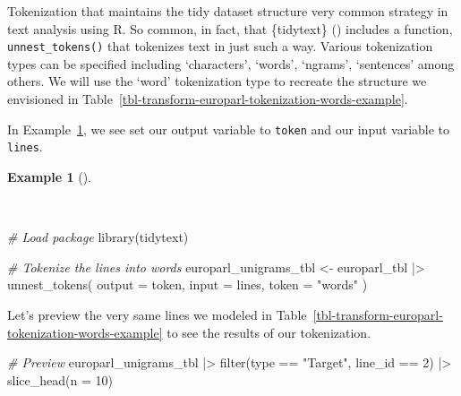 \documentclass[
  letterpaper,
]{latex/krantz}
\newenvironment{Shaded}{\begin{snugshade}}{\end{snugshade}}
\newcommand{\AttributeTok}[1]{\textcolor[rgb]{0.00,0.00,0.00}{#1}}
\newcommand{\CommentTok}[1]{\textcolor[rgb]{0.00,0.00,0.00}{\textit{#1}}}
\newcommand{\DecValTok}[1]{\textcolor[rgb]{0.00,0.00,0.00}{#1}}
\newcommand{\FunctionTok}[1]{\textcolor[rgb]{0.00,0.00,0.00}{#1}}
\newcommand{\NormalTok}[1]{\textcolor[rgb]{0.00,0.00,0.00}{#1}}
\newcommand{\OtherTok}[1]{\textcolor[rgb]{0.00,0.00,0.00}{#1}}
\newcommand{\SpecialCharTok}[1]{\textcolor[rgb]{0.00,0.00,0.00}{#1}}
\newcommand{\StringTok}[1]{\textcolor[rgb]{0.00,0.00,0.00}{#1}}
\theoremstyle{definition}
\newtheorem{example}{Example}[chapter]
\theoremstyle{remark}
\begin{document}
Tokenization that maintains the tidy dataset structure very common
strategy in text analysis using R. So common, in fact, that \{tidytext\}
() includes a
function, \texttt{unnest\_tokens()} that tokenizes text in just such a
way. Various tokenization types can be specified including `characters',
`words', `ngrams', `sentences' among others. We will use the `word'
tokenization type to recreate the structure we envisioned in
Table~\ref{tbl-transform-europarl-tokenization-words-example}.

In Example~\ref{exm-transform-europarl-tokenization-words-tidytext}, we
see set our output variable to \texttt{token} and our input variable to
\texttt{lines}.

\begin{example}[]\protect\hypertarget{exm-transform-europarl-tokenization-words-tidytext}{}\label{exm-transform-europarl-tokenization-words-tidytext}

~

\begin{Shaded}
\begin{Highlighting}[]
\CommentTok{\# Load package}
\FunctionTok{library}\NormalTok{(tidytext)}

\CommentTok{\# Tokenize the lines into words}
\NormalTok{europarl\_unigrams\_tbl }\OtherTok{\textless{}{-}}
\NormalTok{  europarl\_tbl }\SpecialCharTok{|\textgreater{}}
  \FunctionTok{unnest\_tokens}\NormalTok{(}
    \AttributeTok{output =}\NormalTok{ token,}
    \AttributeTok{input =}\NormalTok{ lines,}
    \AttributeTok{token =} \StringTok{"words"}
\NormalTok{  )}
\end{Highlighting}
\end{Shaded}

\end{example}

Let's preview the very same lines we modeled in
Table~\ref{tbl-transform-europarl-tokenization-words-example} to see the
results of our tokenization.

\begin{Shaded}
\begin{Highlighting}[]
\CommentTok{\# Preview}
\NormalTok{europarl\_unigrams\_tbl }\SpecialCharTok{|\textgreater{}}
  \FunctionTok{filter}\NormalTok{(type }\SpecialCharTok{==} \StringTok{"Target"}\NormalTok{, line\_id }\SpecialCharTok{==} \DecValTok{2}\NormalTok{) }\SpecialCharTok{|\textgreater{}}
  \FunctionTok{slice\_head}\NormalTok{(}\AttributeTok{n =} \DecValTok{10}\NormalTok{)}
\end{Highlighting}
\end{Shaded}
\end{document}
